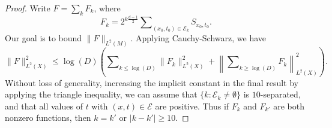 \begin{proof}
Write $F = \sum_k F_k$, where
%
\begin{equation}
    F_k = 2^{k \frac{d-1}{2}} \sum\nolimits_{(x_0,t_0) \in \mathcal{E}_k} {S\!}_{x_0,t_0}.
\end{equation}
%
Our goal is to bound $\| F \|_{L^2(M)}$. Applying Cauchy-Schwarz, we have
%
\begin{equation} \label{loglossbound}
    \| F \|_{L^2(X)}^2 \leq \log(D) \left( \sum\nolimits_{k \leq \log(D)} \| F_k \|_{L^2(X)}^2 + \left\| \sum\nolimits_{k \geq \log(D)} F_k \right\|_{L^2(X)}^2 \right).
\end{equation}
%
Without loss of generality, increasing the implicit constant in the final result by applying the triangle inequality, we can assume that $\{ k : \mathcal{E}_k \neq \emptyset \}$ is $10$-separated, and that all values of $t$ with $(x,t) \in \mathcal{E}$ are positive. Thus if $F_k$ and $F_{k'}$ are both nonzero functions, then $k = k'$ or $|k - k'| \geq 10$.


\end{proof}
